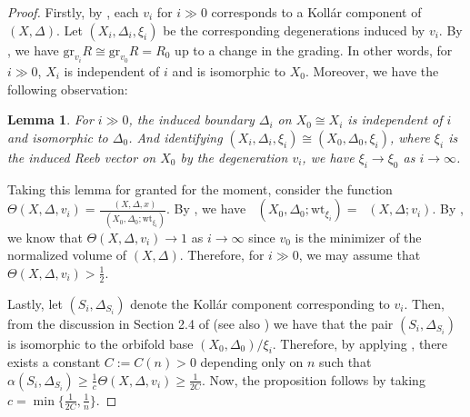 \documentclass[11pt,reqno]{amsart}
\newcommand{\isom}{\cong}
\DeclareMathOperator{\nvol}{\widehat{vol}}
\numberwithin{equation}{section}
\newtheorem{lem}[prop] {Lemma}
\theoremstyle{definition}
\begin{document}
\begin{proof}
        Firstly, by \cite[Proposition 4.11]{LiXuHigherRank}, each $v_i$ for $i \gg 0$ corresponds to a Koll\'ar component of $(X, \Delta)$. Let $(X_i, \Delta_i, \xi_i)$ be the corresponding degenerations induced by $v_i$. By \cite[Lemma 2.10]{LiXuHigherRank}, we have $\text{gr} _{v_i} R \isom \text{gr}_{v_0} R = R_0$ up to a change in the grading. In other words, for $i \gg 0$, $X_i$ is independent of $i$ and is isomorphic to $X_0$. Moreover, we have the following observation:

        \begin{lem} \label{lem:independenceofboundary}
            For $i \gg 0$, the induced boundary $\Delta_i$ on $X_ 0 \isom X_i$ is independent of $i$ and isomorphic to $\Delta_0$. And identifying $(X_i, \Delta_i, \xi_i) \isom (X_0, \Delta_0, \xi_i)$, where $\xi_i$ is the induced Reeb vector on $X_0$ by the degeneration $v_i$, we have $\xi_i \to \xi_0$ as $i \to \infty$.  
        \end{lem}
       
        Taking this lemma for granted for the moment, consider the function $\Theta(X, \Delta, v_i) = \frac{\nvol (X, \Delta,x)}{\nvol(X_0, \Delta_0; \text{wt}_{\xi_i})}$. By \cite[Lemma 4.10]{LiXuHigherRank}, we have $\nvol(X_0, \Delta_0; \text{wt}_{\xi_i}) = \nvol (X, \Delta; v_i)$. By \cite[Lemma 2.11]{ZhuangBoundednessandmld}, we know that $\Theta (X, \Delta, v_i) \to 1$ as $i \to \infty$ since $v_0$ is the minimizer of the normalized volume of $(X, \Delta)$. Therefore, for $i \gg 0$, we may assume that $\Theta(X, \Delta, v_i) > \frac{1}{2}$.

        Lastly, let $(S_i, \Delta_{S_i})$ denote the Koll\'ar component corresponding to $v_i$. Then, from the discussion in Section 2.4 of \cite{XuZhuangboundednesslogfanocone} (see also \cite[Proposition 2.10]{LiuZhuangSharpnessofTianscriterion}) we have that the pair $(S_i, \Delta_{S_i})$ is isomorphic to the orbifold base $(X_0, \Delta_0)/\xi_i$. Therefore, by applying \cite[Lemma 2.12]{XuZhuangboundednesslogfanocone}, there exists a constant $C:= C(n)>0$ depending only on $n$ such that $ \alpha(S_i, \Delta_{S_i})  \geq \frac{1}{c} \Theta(X, \Delta, v_i) \geq \frac{1}{2C}. $ Now, the proposition follows by taking $ c = \min \{\frac{1}{2C} , \frac{1}{n} \} $.
\end{proof}
\end{document}
